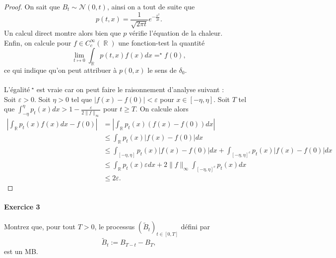 \documentclass{article}
\theoremstyle{definition}
\numberwithin{equation}{section}
\DeclareMathOperator{\R}{\mathbb{R}}
\begin{document}
\begin{proof}
On sait que $B_t\sim\mathcal{N}(0,t)$, ainsi on a tout de suite que 
$$ p(t,x) = \dfrac{1}{\sqrt{2\pi t}}e^{-\frac{x^2}{2t}}. $$
Un calcul direct montre alors bien que $p$ vérifie l'équation de la chaleur.\\
Enfin, on calcule pour $f\in C^\infty_c(\R)$ une fonction-test la quantité 
$$\lim_{t\mapsto 0}\int_{\R} p(t,x) f(x) dx =^\star f(0), $$
ce qui indique qu'on peut attribuer à $p(0,x)$ le sens de $\delta_0$.\\
~\\
L'égalité$~^\star$ est vraie car on peut faire le raisonnement d'analyse suivant :\\
Soit $\varepsilon>0$. Soit $\eta>0$ tel que $|f(x)-f(0)|<\varepsilon$ pour $x\in [-\eta,\eta]$. Soit $T$ tel que $\int_{-\eta}^\eta p_t(x)dx>1-\frac{\varepsilon}{2\|f\|_\infty}$ pour $t\geq T$. On calcule alors
\begin{align*}
    \left| \int_{\R} p_t(x)f(x)dx-f(0) \right| &= \left| \int_{\R} p_t(x)(f(x)-f(0))dx \right| \\
    &\leq \int_{\R} p_t(x)|f(x)-f(0)|dx  \\
    &\leq \int_{[-\eta,\eta]} p_t(x)|f(x)-f(0)|dx + \int_{[-\eta,\eta]^c} p_t(x)|f(x)-f(0)|dx \\
    &\leq \int_{\R}p_t(x)\varepsilon dx + 2\|f\|_\infty \int_{[-\eta,\eta]^c} p_t(x)dx \\
    &\leq 2\varepsilon.
\end{align*}
\end{proof}


\paragraph{Exercice 3}
Montrez que, pour tout $T>0$, le processus $(\tilde{B}_t)_{t\in [0,T]}$ défini par
$$ \tilde{B}_t := B_{T-t}-B_T, $$
est un MB.
\end{document}
